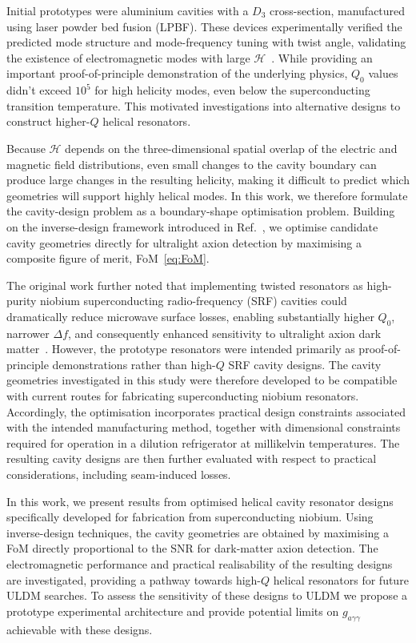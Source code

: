 \documentclass[
  aps,
  physrev,
  reprint,
  superscriptaddress,
  nofootinbib,
  amsmath,
  amssymb
]{revtex4-2}
\begin{document}
Initial prototypes were aluminium cavities with a $D_3$ cross-section, manufactured using laser powder bed fusion (LPBF). These devices experimentally verified the predicted mode structure and mode-frequency tuning with twist angle, validating the existence of electromagnetic modes with large $\mathscr H$~\cite{Bourhill2023}. While providing an important proof-of-principle demonstration of the underlying physics, $Q_0$ values didn't exceed $10^5$ for high helicity modes, even below the superconducting transition temperature. This motivated investigations into alternative designs to construct higher-$Q$ helical resonators.

Because $\mathscr H$ depends on the three-dimensional spatial overlap of the electric and magnetic field distributions, even small changes to the cavity boundary can produce large changes in the resulting helicity, making it difficult to predict which geometries will support highly helical modes. In this work, we therefore formulate the cavity-design problem as a boundary-shape optimisation problem. Building on the inverse-design framework introduced in Ref.~\cite{Paterson2026InverseDesign}, we optimise candidate cavity geometries directly for ultralight axion detection by maximising a composite figure of merit, FoM~\eqref{eq:FoM}.

The original work further noted that implementing twisted resonators as high-purity niobium superconducting radio-frequency (SRF) cavities could dramatically reduce microwave surface losses, enabling substantially higher $Q_0$, narrower $\Delta f$, and consequently enhanced sensitivity to ultralight axion dark matter~\cite{Bourhill2023}. However, the prototype resonators were intended primarily as proof-of-principle demonstrations rather than high-$Q$ SRF cavity designs. The cavity geometries investigated in this study were therefore developed to be compatible with current routes for fabricating superconducting niobium resonators. Accordingly, the optimisation incorporates practical design constraints associated with the intended manufacturing method, together with dimensional constraints required for operation in a dilution refrigerator at millikelvin temperatures. The resulting cavity designs are then further evaluated with respect to practical considerations, including seam-induced losses.

In this work, we present results from optimised helical cavity resonator designs specifically developed for fabrication from superconducting niobium. Using inverse-design techniques, the cavity geometries are obtained by maximising a FoM directly proportional to the SNR for dark-matter axion detection. The electromagnetic performance and practical realisability of the resulting designs are investigated, providing a pathway towards high-$Q$ helical resonators for future ULDM searches. To assess the sensitivity of these designs to ULDM we propose a prototype experimental architecture and provide potential limits on $g_{a\gamma\gamma}$ achievable with these designs.
\end{document}
